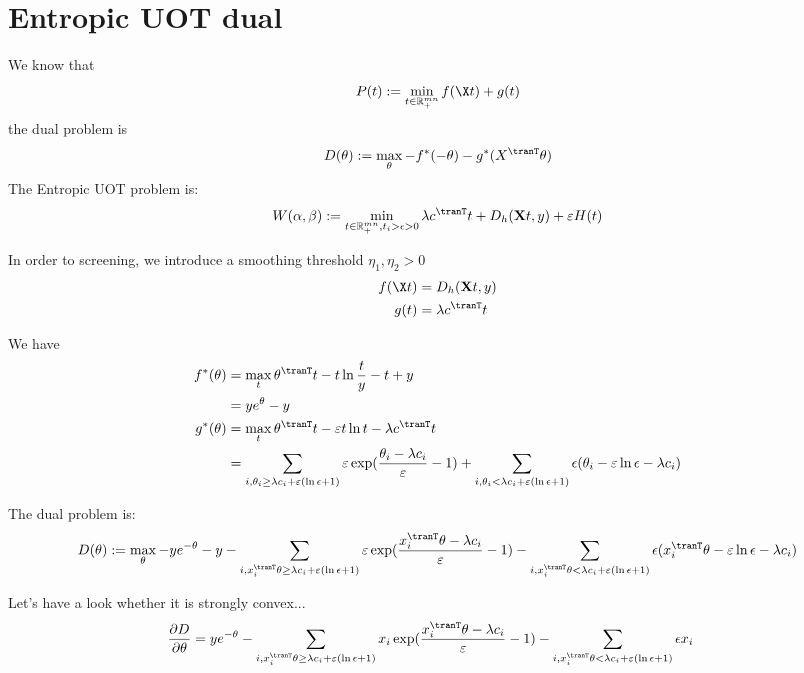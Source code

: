 
\section{Entropic UOT dual}
We know that 
\begin{equation}
P(t):= \min_{t \in \mathbb{R}_{+}^{mn}} f(\X t) + g(t)
\end{equation}
the dual problem is 
\begin{equation}
D(\theta) := \max_{\theta} -f^*(-\theta) - g^*(X^{\tranT}\theta)
\end{equation}
The Entropic UOT problem is:
\begin{equation}
\label{eq:euot}
W(\alpha,\beta) := \min_{t \in \mathbb{R}_{+}^{mn}, t_i>\epsilon>0} \lambda c^{\tranT}t + D_h(\mathbf{X}t,y) + \varepsilon H(t)
\end{equation}

In order to screening, we introduce a smoothing threshold $\eta_1,\eta_2 > 0$ 
$$
\begin{aligned}
f(\X t) &=  D_h(\mathbf{X}t,y) \\
g(t) &= \lambda c^{\tranT} t
\end{aligned}
$$

We have 
$$
\begin{aligned}
f^{*}(\theta) &= \max_t \theta^{\tranT} t - t\ln \frac{t}{y} - t+y\\
&=ye^{\theta} - y\\
g^{*}(\theta) &= \max_t \theta^{\tranT} t - \varepsilon t\ln t - \lambda c^{\tranT}t\\
&= \sum_{i,\theta_i\geq\lambda c_i +\varepsilon(\ln \epsilon + 1)} \varepsilon \exp(\frac{\theta_i-\lambda c_i}{\varepsilon}-1)+\sum_{i,\theta_i<\lambda c_i +\varepsilon(\ln \epsilon + 1)} \epsilon(\theta_i - \varepsilon\ln\epsilon-\lambda c_i)
\end{aligned}
$$

The dual problem is:
\begin{equation}
\label{eq:reuot}
D(\theta) := \max_{\theta} -ye^{-\theta} - y - \sum_{i,x_i^{\tranT}\theta\geq\lambda c_i +\varepsilon(\ln \epsilon + 1)} \varepsilon \exp(\frac{x_i^{\tranT}\theta-\lambda c_i}{\varepsilon}-1) - \sum_{i,x_i^{\tranT}\theta<\lambda c_i +\varepsilon(\ln \epsilon + 1)} \epsilon(x_i^{\tranT}\theta - \varepsilon\ln\epsilon-\lambda c_i)
\end{equation}

Let's have a look whether it is strongly convex...
$$
\begin{aligned}
\frac{\partial D}{\partial \theta} &=  ye^{-\theta} -  \sum_{i,x_i^{\tranT}\theta\geq\lambda c_i +\varepsilon(\ln \epsilon + 1)} x_i\exp(\frac{x_i^{\tranT}\theta-\lambda c_i}{\varepsilon}-1) -\sum_{i,x_i^{\tranT}\theta<\lambda c_i +\varepsilon(\ln \epsilon + 1)} \epsilon x_i
\end{aligned}
$$

